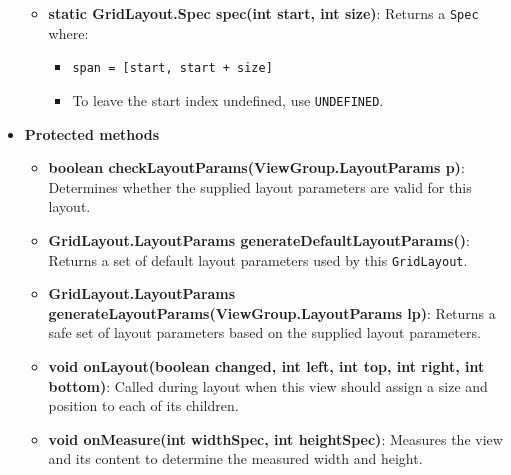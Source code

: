 \documentclass{report}
\begin{document}
\begin{itemize}
\begin{itemize}
                \item \textbf{static GridLayout.Spec spec(int start, int size)}: Returns a \texttt{Spec} where:
                    \begin{itemize}
                        \item \texttt{span = [start, start + size]}
                        \item To leave the start index undefined, use \texttt{UNDEFINED}.
                    \end{itemize}
            \end{itemize}

        \item \textbf{Protected methods}
            \begin{itemize}
                \item \textbf{boolean checkLayoutParams(ViewGroup.LayoutParams p)}: Determines whether the supplied layout parameters are valid for this layout.
                \item \textbf{GridLayout.LayoutParams generateDefaultLayoutParams()}: Returns a set of default layout parameters used by this \texttt{GridLayout}.
                \item \textbf{GridLayout.LayoutParams generateLayoutParams(ViewGroup.LayoutParams lp)}: Returns a safe set of layout parameters based on the supplied layout parameters.
                \item \textbf{void onLayout(boolean changed, int left, int top, int right, int bottom)}: Called during layout when this view should assign a size and position to each of its children.
                \item \textbf{void onMeasure(int widthSpec, int heightSpec)}: Measures the view and its content to determine the measured width and height.
            \end{itemize}


\end{itemize}
\end{document}
